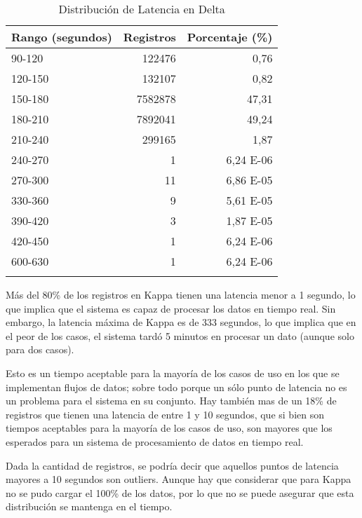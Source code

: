 \newpage

\begin{longtable}{|l|r|r|}
    \hline
    \textbf{Rango (segundos)} & \textbf{Registros} & \textbf{Porcentaje (\%)} \\
    \hline
    \endhead
    90-120 & 122476 & 0,76 \\
    \hline
    120-150 & 132107 & 0,82 \\
    \hline
    150-180 & 7582878 & 47,31 \\
    \hline
    180-210 & 7892041 & 49,24 \\
    \hline
    210-240 & 299165 & 1,87 \\
    \hline
    240-270 & 1 & 6,24 E-06 \\
    \hline
    270-300 & 11 & 6,86 E-05 \\
    \hline
    330-360 & 9 & 5,61 E-05 \\
    \hline
    390-420 & 3 & 1,87 E-05 \\
    \hline
    420-450 & 1 & 6,24 E-06 \\
    \hline
    600-630 & 1 & 6,24 E-06 \\
    \hline
    \caption{Distribución de Latencia en Delta} \\
\end{longtable}

Más del 80\% de los registros en Kappa tienen una latencia menor a 1 segundo, lo que implica que el sistema es capaz de procesar los datos en tiempo real.
Sin embargo, la latencia máxima de Kappa es de 333 segundos, lo que implica que en el peor de los casos, el sistema tardó 5 minutos en procesar un dato (aunque solo para dos casos). \newline

Esto es un tiempo aceptable para la mayoría de los casos de uso en los que se implementan flujos de datos;
sobre todo porque un sólo punto de latencia no es un problema para el sistema en su conjunto.
Hay también mas de un 18\% de registros que tienen una latencia de entre 1 y 10 segundos, 
que si bien son tiempos aceptables para la mayoría de los casos de uso, son mayores que los esperados para un sistema de procesamiento de datos en tiempo real. \newline

Dada la cantidad de registros, se podría decir que aquellos puntos de latencia mayores a 10 segundos son outliers.
Aunque hay que considerar que para Kappa no se pudo cargar el 100\% de los datos,
por lo que no se puede asegurar que esta distribución se mantenga en el tiempo. \newline


